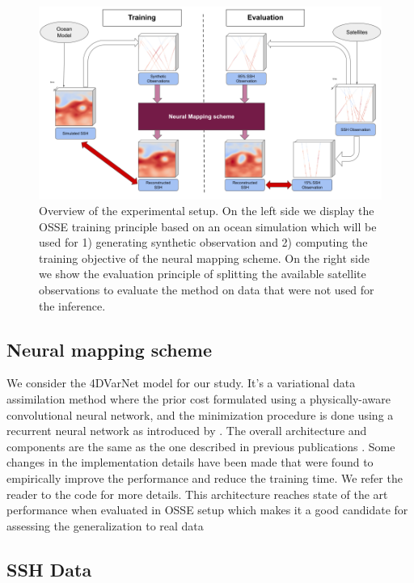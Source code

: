 \documentclass[draft]{agujournal2019}
\begin{document}
\begin{figure}[ht]
    \centering
    \includegraphics[width=\textwidth]{figures/schema_method.png}
    \caption{Overview of the experimental setup. On the left side we display the OSSE training principle based on an ocean simulation which will be used for 1) generating synthetic observation and 2) computing the training objective of the neural mapping scheme. On the right side we show the evaluation principle of splitting the available satellite observations to evaluate the method on data that were not used for the inference.}
    \label{fig:method}
\end{figure}


\subsection{Neural mapping scheme}
\label{ssec:4dvarnet}

We consider the 4DVarNet model for our study. It's a variational data assimilation method where the prior cost formulated using a physically-aware convolutional neural network, and the minimization procedure is done using a recurrent neural network as introduced by \cite{andrychowiczLearningLearnGradient}.
The overall architecture and components are the same as the one described in previous publications \cite{fabletENDTOENDPHYSICSINFORMEDREPRESENTATION2021}. Some changes in the implementation details have been made that were found to empirically improve the performance and reduce the training time. We refer the reader to the code for more details.
This architecture reaches state of the art performance when evaluated in OSSE setup which makes it a good candidate for assessing the generalization to real data


\subsection{SSH Data}
\label{ssec:data}
\end{document}
